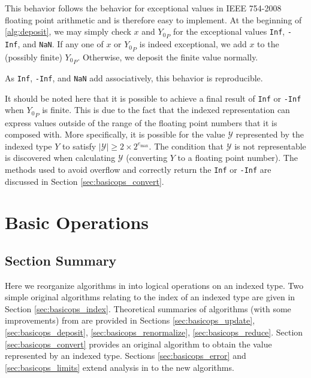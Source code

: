 \documentclass[12pt]{article}
\providecommand{\max}{\ensuremath{\text{max}}}
\theoremstyle{definition}
\numberwithin{equation}{section}
\begin{document}
      This behavior follows the behavior for exceptional values in IEEE 754-2008 floating point arithmetic and is therefore easy to implement. At the beginning of \ref{alg:deposit}, we may simply check $x$ and ${Y_0}_P$ for the exceptional values \verb|Inf|, \verb|-Inf|, and \verb|NaN|. If any one of $x$ or ${Y_0}_P$ is indeed exceptional, we add $x$ to the (possibly finite) ${Y_0}_P$. Otherwise, we deposit the finite value normally.

      As \verb|Inf|, \verb|-Inf|, and \verb|NaN| add associatively, this behavior is reproducible.

      It should be noted here that it is possible to achieve a final result of \verb|Inf| or \verb|-Inf| when ${Y_0}_P$ is finite. This is due to the fact that the indexed representation can express values outside of the range of the floating point numbers that it is composed with. More specifically, it is possible for the value $\mathcal{Y}$ represented by the indexed type $Y$ to satisfy $|\mathcal{Y}| \geq 2 \times 2^{e_{\max}}$. The condition that $\mathcal{Y}$ is not representable is discovered when calculating $\mathcal{Y}$ (converting $Y$ to a floating point number). The methods used to avoid overflow and correctly return the \verb|Inf| or \verb|-Inf| are discussed in Section \ref{sec:basicops_convert}.

\section{Basic Operations}
  \subsection{Section Summary}
    Here we reorganize algorithms in \cite{repsum} into logical operations on an indexed type. Two simple original algorithms relating to the index of an indexed type are given in Section \ref{sec:basicops_index}. Theoretical summaries of algorithms (with some improvements) from \cite{repsum} are provided in Sections \ref{sec:basicops_update}, \ref{sec:basicops_deposit}, \ref{sec:basicops_renormalize}, \ref{sec:basicops_reduce}. Section \ref{sec:basicops_convert} provides an original algorithm to obtain the value represented by an indexed type. Sections \ref{sec:basicops_error} and \ref{sec:basicops_limits} extend analysis in \cite{repsum} to the new algorithms.
\end{document}
